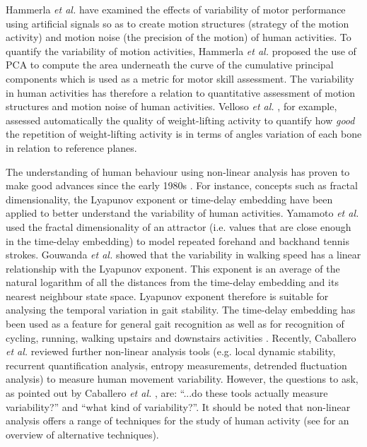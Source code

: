 \documentclass[10pt,journal,compsoc]{IEEEtran}
\begin{document}
Hammerla \textit{et al.} \cite{hammerla2011} have examined the effects of
variability of motor performance using artificial signals so as 
to create motion structures (strategy of the motion activity) 
and motion noise (the precision of the motion) of human 
activities. To quantify the variability of motion activities, 
Hammerla \textit{et al.} \cite{hammerla2011} proposed the use of PCA to compute 
the area underneath the curve of the cumulative principal 
components which is used as a metric for motor skill assessment.
The variability in human activities has therefore 
a relation to quantitative assessment of motion structures 
and motion noise of human activities. Velloso \textit{et al.} \cite{Velloso2013a, Velloso2013b}, 
for example, assessed automatically the quality of weight-lifting 
activity to quantify how \textit{good} the repetition of 
weight-lifting activity is in terms of angles variation of each bone 
in relation to reference planes. 

The understanding of human behaviour using non-linear 
analysis has proven to make good advances since the early 1980s 
\cite{Huys2011, KantzSchreiber04}. For instance, concepts such as fractal 
dimensionality, the Lyapunov exponent or time-delay 
embedding have been applied to better understand the 
variability of human activities. Yamamoto \textit{et al.} \cite{Suzuki2013, Yamamoto2000} 
used the fractal dimensionality of an attractor 
(i.e. values that are close enough in the time-delay embedding)
to model repeated forehand and backhand tennis strokes.
Gouwanda \textit{et al.} \cite{Gouwanda2012} showed that the variability in walking 
speed has a linear relationship with the Lyapunov exponent. 
This exponent is an average of the natural logarithm of all 
the distances from the time-delay embedding and its nearest 
neighbour state space. Lyapunov exponent therefore is suitable
for analysing the temporal variation in gait stability.
The time-delay embedding has been used as a feature for 
general gait recognition \cite{Sama2013} as well as for recognition 
of cycling, running, walking upstairs and downstairs activities \cite{Frank2010}.
Recently,  Caballero \textit{et al.} \cite{Caballero2014} reviewed further non-linear 
analysis tools (e.g. local dynamic stability, recurrent quantification analysis, 
entropy measurements, detrended fluctuation analysis) to measure human movement 
variability.  However, the questions to ask, as pointed out by 
Caballero \textit{et al.} \cite{Caballero2014}, are: ``...do these tools actually 
measure variability?'' and ``what kind of variability?''.
It should be noted that non-linear analysis offers a range of techniques 
for the study of human activity (see \cite{Guastello2011} 
for an overview of alternative techniques). 
\end{document}
